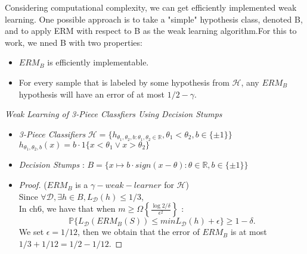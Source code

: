 Considering computational complexity, we can get efficiently implemented weak learning.
One possible approach is to take a "simple" hypothesis class, denoted B, and to apply
ERM with respect to B as the weak learning algorithm.For this to work, we nned B with 
two properties:
\begin{itemize}
	\item $ERM_B$ is efficiently implementable.
	\item For every sample that is labeled by some hypothesis from $\mathcal{H}$, any
		$ERM_B$ hypothesis will have an error of at most $1/2-\gamma$.
\end{itemize}

\begin{exam}
	\emph{Weak Learning of 3-Piece Classfiers Using Decision Stumps}
	\begin{itemize}
		\item \emph{3-Piece Classifiers} $\mathcal{H} = \{ h_{\theta_1,\theta_2,b:\theta_1, \theta_2 \in \mathbb{R}},
			\theta_1 < \theta_2, b\in\{ \pm 1 \} \}$\\
			$h_{\theta_1,\theta_2,b}(x) = b \cdot {1} \{ x<\theta_1 \vee x>\theta_2 \}$	
		\item \emph{Decision Stumps} : 
			$B = \{ x \mapsto b \cdot sign(x-\theta) : \theta \in \mathbb{R}, b \in \{ \pm 1 \} \}$
		\item
			\begin{proof}
				($ERM_B$ is a $\gamma-weak-learner$ for $\mathcal{H}$)\\
				Since $\forall \mathcal{D}, \exists h \in B, L_\mathcal{D}(h) \le 1/3$,\\
                In ch6, we have that when $m \ge \Omega\left\{ \frac{\log 2/\delta}{\epsilon^2} \right\}$ : 
				\[
					\mathbb{P}\{L_\mathcal{D}(ERM_B(S)) \le min L_\mathcal{D}(h) + \epsilon\} \ge 1-\delta
				.\]
				We set $\epsilon = 1/12$, then we obtain that the error of $ERM_B$ is at most
				$1/3+1/12 = 1/2-1/12$.
			\end{proof}
	\end{itemize}
\end{exam}

